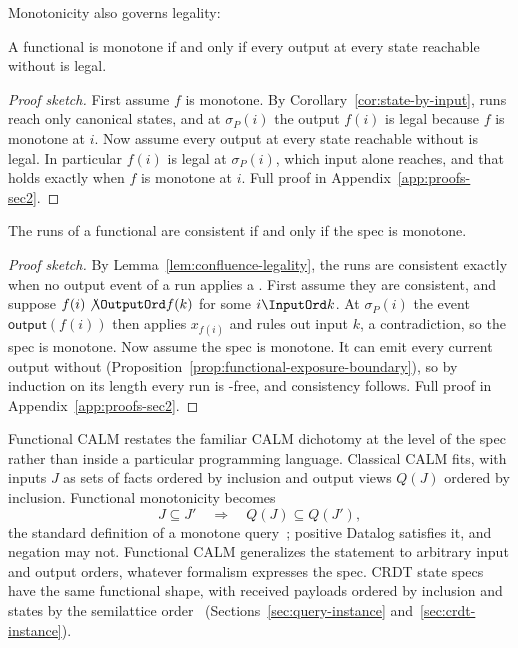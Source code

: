 Monotonicity also governs legality:

\begin{proposition}
\label{prop:functional-exposure-boundary}
A functional \spectype is monotone if and only if every output at
every state reachable without \commitment is legal.
\end{proposition}

\begin{proof}[Proof sketch]
First assume $f$ is monotone.  By Corollary~\ref{cor:state-by-input}, runs
reach only canonical states, and at $\sigma_P(i)$ the output $f(i)$ is legal
because $f$ is monotone at $i$.  Now assume every output at every state
reachable without \commitment is legal.  In particular $f(i)$ is legal at
$\sigma_P(i)$, which input alone reaches, and that holds exactly when $f$ is
monotone at $i$.  Full proof in Appendix~\ref{app:proofs-sec2}.
\end{proof}

\begin{theorem}
\label{thm:functional-calm}
The runs of a functional \spectype are consistent if and only if the spec is
monotone.
\end{theorem}

\begin{proof}[Proof sketch]
By Lemma~\ref{lem:confluence-legality}, the runs are consistent exactly when
no output event of a run applies a \commitment.  First assume they are
consistent, and suppose $f(i)\not\OutputOrd f(k)$ for some $i\InputOrd k$.  At
$\sigma_P(i)$ the event $\mathsf{output}(f(i))$ then applies $x_{f(i)}$ and
rules out input $k$, a contradiction, so the spec is monotone.  Now assume the
spec is monotone.  It can emit every current output without \commitment
(Proposition~\ref{prop:functional-exposure-boundary}), so by induction on its
length every run is \commitment-free, and consistency follows.  Full proof in
Appendix~\ref{app:proofs-sec2}.
\end{proof}

Functional CALM restates the familiar CALM dichotomy at the level of the spec
rather than inside a particular programming language.
Classical CALM fits, with inputs $J$ as sets of facts ordered by
inclusion and output views $Q(J)$ ordered by inclusion.  Functional
monotonicity becomes
        \begin{equation}
  J\subseteq J'
  \quad\Longrightarrow\quad
  Q(J)\subseteq Q(J'),
  \label{eq:query-monotonicity}
        \end{equation}
the standard definition of a monotone query~\cite{abiteboul1995foundations};
positive Datalog satisfies it, and negation may not.  Functional CALM
generalizes the statement to arbitrary input and
output orders, whatever formalism expresses the spec.  CRDT state specs have the same functional shape, with received payloads ordered by inclusion and states by the semilattice order~\cite{shapiro2011crdt} (Sections~\ref{sec:query-instance}
and~\ref{sec:crdt-instance}).
